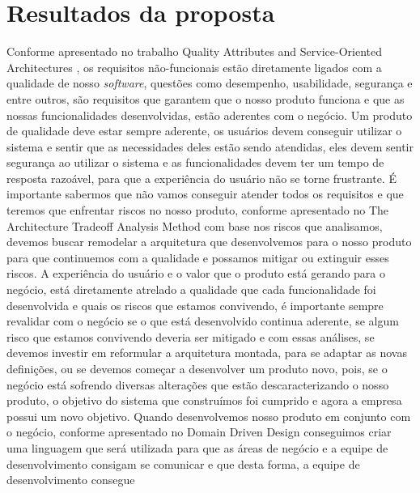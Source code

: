   \chapter{Resultados da proposta}
    Conforme apresentado no trabalho Quality Attributes and Service-Oriented Architectures
    \cite{O'BrienQualityAttributes2005}, os requisitos não-funcionais estão diretamente
    ligados com a qualidade de nosso \textit{software}, questões como desempenho,
    usabilidade, segurança e entre outros, são requisitos que garantem que o nosso
    produto funciona e que as nossas funcionalidades desenvolvidas, estão aderentes
    com o negócio. \newline
    Um produto de qualidade deve estar sempre aderente, os usuários devem conseguir
    utilizar o sistema e sentir que as necessidades deles estão sendo atendidas,
    eles devem sentir segurança ao utilizar o sistema e as funcionalidades devem
    ter um tempo de resposta razoável, para que a experiência do usuário não se
    torne frustrante. É importante sabermos que não vamos conseguir atender todos
    os requisitos e que teremos que enfrentar riscos no nosso produto, conforme
    apresentado no The Architecture Tradeoff Analysis Method \cite{KazmanTheArchitecture1998}
    com base nos riscos que analisamos, devemos buscar remodelar a arquitetura que
    desenvolvemos para o nosso produto para que continuemos com a qualidade e possamos
    mitigar ou extinguir esses riscos. A experiência do usuário e o valor que o
    produto está gerando para o negócio, está diretamente atrelado a qualidade
    que cada funcionalidade foi desenvolvida e quais os riscos que estamos convivendo,
    é importante sempre revalidar com o negócio se o que está desenvolvido continua
    aderente, se algum risco que estamos convivendo deveria ser mitigado e com essas
    análises, se devemos investir em reformular a arquitetura montada, para se
    adaptar as novas definições, ou se devemos começar a desenvolver um produto
    novo, pois, se o negócio está sofrendo diversas alterações que estão descaracterizando
    o nosso produto, o objetivo do sistema que construímos foi cumprido e agora
    a empresa possui um novo objetivo. \newline
    Quando desenvolvemos nosso produto em conjunto com o negócio, conforme apresentado
    no Domain Driven Design \cite{DomainDrivenDesign} conseguimos criar uma linguagem
    que será utilizada para que as áreas de negócio e a equipe de desenvolvimento
    consigam se comunicar e que desta forma, a equipe de desenvolvimento consegue
